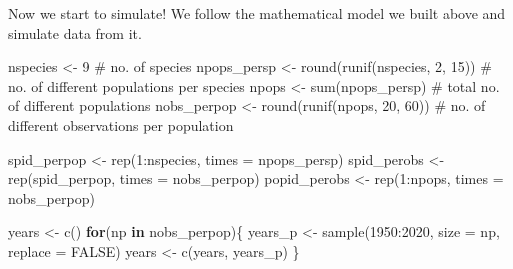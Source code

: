 \documentclass[
  letterpaper,
  DIV=11,
  numbers=noendperiod]{scrartcl}
\newenvironment{Shaded}{\begin{snugshade}}{\end{snugshade}}
\newcommand{\AttributeTok}[1]{\textcolor[rgb]{0.40,0.45,0.13}{#1}}
\newcommand{\CommentTok}[1]{\textcolor[rgb]{0.37,0.37,0.37}{#1}}
\newcommand{\ConstantTok}[1]{\textcolor[rgb]{0.56,0.35,0.01}{#1}}
\newcommand{\ControlFlowTok}[1]{\textcolor[rgb]{0.00,0.23,0.31}{\textbf{#1}}}
\newcommand{\DecValTok}[1]{\textcolor[rgb]{0.68,0.00,0.00}{#1}}
\newcommand{\FunctionTok}[1]{\textcolor[rgb]{0.28,0.35,0.67}{#1}}
\newcommand{\NormalTok}[1]{\textcolor[rgb]{0.00,0.23,0.31}{#1}}
\newcommand{\OtherTok}[1]{\textcolor[rgb]{0.00,0.23,0.31}{#1}}
\newcommand{\SpecialCharTok}[1]{\textcolor[rgb]{0.37,0.37,0.37}{#1}}
\begin{document}
Now we start to simulate! We follow the mathematical model we built
above and simulate data from it.

\begin{Shaded}
\begin{Highlighting}[]
\NormalTok{nspecies }\OtherTok{\textless{}{-}} \DecValTok{9} \CommentTok{\# no. of species}
\NormalTok{npops\_persp }\OtherTok{\textless{}{-}} \FunctionTok{round}\NormalTok{(}\FunctionTok{runif}\NormalTok{(nspecies, }\DecValTok{2}\NormalTok{, }\DecValTok{15}\NormalTok{)) }\CommentTok{\# no. of different populations per species}
\NormalTok{npops }\OtherTok{\textless{}{-}} \FunctionTok{sum}\NormalTok{(npops\_persp) }\CommentTok{\# total no. of different populations}
\NormalTok{nobs\_perpop }\OtherTok{\textless{}{-}} \FunctionTok{round}\NormalTok{(}\FunctionTok{runif}\NormalTok{(npops, }\DecValTok{20}\NormalTok{, }\DecValTok{60}\NormalTok{)) }\CommentTok{\# no. of different observations per population}

\NormalTok{spid\_perpop }\OtherTok{\textless{}{-}} \FunctionTok{rep}\NormalTok{(}\DecValTok{1}\SpecialCharTok{:}\NormalTok{nspecies, }\AttributeTok{times =}\NormalTok{ npops\_persp)}
\NormalTok{spid\_perobs }\OtherTok{\textless{}{-}} \FunctionTok{rep}\NormalTok{(spid\_perpop, }\AttributeTok{times =}\NormalTok{ nobs\_perpop)}
\NormalTok{popid\_perobs }\OtherTok{\textless{}{-}} \FunctionTok{rep}\NormalTok{(}\DecValTok{1}\SpecialCharTok{:}\NormalTok{npops, }\AttributeTok{times =}\NormalTok{ nobs\_perpop)}

\NormalTok{years }\OtherTok{\textless{}{-}} \FunctionTok{c}\NormalTok{()}
\ControlFlowTok{for}\NormalTok{(np }\ControlFlowTok{in}\NormalTok{ nobs\_perpop)\{}
\NormalTok{  years\_p }\OtherTok{\textless{}{-}} \FunctionTok{sample}\NormalTok{(}\DecValTok{1950}\SpecialCharTok{:}\DecValTok{2020}\NormalTok{, }\AttributeTok{size =}\NormalTok{ np, }\AttributeTok{replace =} \ConstantTok{FALSE}\NormalTok{)}
\NormalTok{  years }\OtherTok{\textless{}{-}} \FunctionTok{c}\NormalTok{(years, years\_p)}
\NormalTok{\}}


\end{Highlighting}
\end{Shaded}
\end{document}
